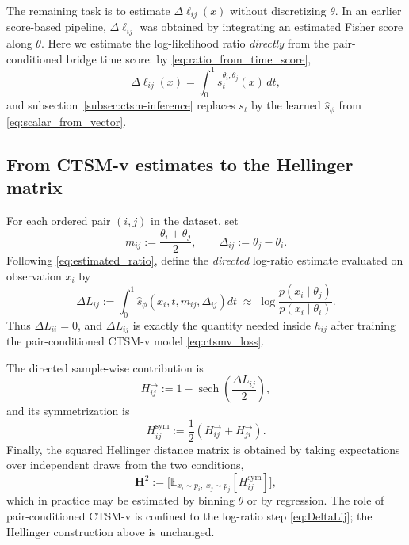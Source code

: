 The remaining task is to estimate $\Delta \ell_{ij}(x)$ without discretizing $\theta$. In an earlier score-based pipeline, $\Delta \ell_{ij}$ was obtained by integrating an estimated Fisher score along $\theta$. Here we estimate the log-likelihood ratio \emph{directly} from the pair-conditioned bridge time score: by \eqref{eq:ratio_from_time_score},
\begin{equation}
    \Delta \ell_{ij}(x)
    =
    \int_0^1 s_t^{\theta_i,\theta_j}(x)\,dt,
\end{equation}
and subsection~\ref{subsec:ctsm-inference} replaces $s_t$ by the learned $\hat s_\phi$ from \eqref{eq:scalar_from_vector}.

\subsection{From CTSM-v estimates to the Hellinger matrix}

For each ordered pair $(i,j)$ in the dataset, set
\begin{equation}
    m_{ij}:=\frac{\theta_i+\theta_j}{2},
    \qquad
    \Delta_{ij}:=\theta_j-\theta_i.
\end{equation}
Following \eqref{eq:estimated_ratio}, define the \emph{directed} log-ratio estimate evaluated on observation $x_i$ by
\begin{equation}
    \Delta L_{ij}
    :=
    \int_0^1 \hat s_\phi\!\left(x_i,t,m_{ij},\Delta_{ij}\right) dt
    \;\approx\;
    \log \frac{p(x_i\mid \theta_j)}{p(x_i\mid \theta_i)}.
    \label{eq:DeltaLij}
\end{equation}
Thus $\Delta L_{ii}=0$, and $\Delta L_{ij}$ is exactly the quantity needed inside $h_{ij}$ after training the pair-conditioned CTSM-v model \eqref{eq:ctsmv_loss}.

The directed sample-wise contribution is
\begin{equation}
    H^{\rightarrow}_{ij}
    :=
    1-\operatorname{sech}\!\left(\frac{\Delta L_{ij}}{2}\right),
\end{equation}
and its symmetrization is
\begin{equation}
    H^{\mathrm{sym}}_{ij}
    :=
    \frac12\left(H^{\rightarrow}_{ij}+H^{\rightarrow}_{ji}\right).
\end{equation}
Finally, the squared Hellinger distance matrix is obtained by taking expectations over independent draws from the two conditions,
\begin{equation}
    \mathbf{H}^2
    :=
    \bigl[\mathbb{E}_{x_i\sim p_i,\;x_j\sim p_j}[H^{\mathrm{sym}}_{ij}]\bigr],
    \label{eq:H2_matrix}
\end{equation}
which in practice may be estimated by binning $\theta$ or by regression. The role of pair-conditioned CTSM-v is confined to the log-ratio step \eqref{eq:DeltaLij}; the Hellinger construction above is unchanged.

